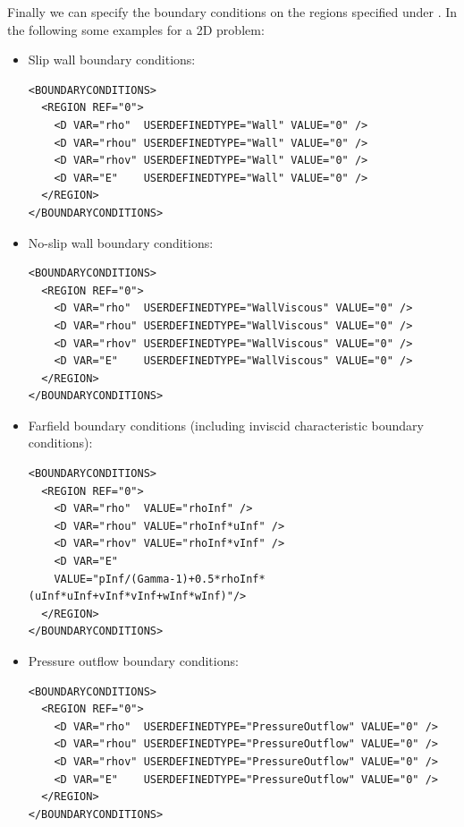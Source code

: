 Finally we can specify the boundary conditions on the regions specified under .
In the following some examples for a 2D problem:
\begin{itemize}
\item Slip wall boundary conditions:
\begin{lstlisting}[style=XmlStyle]                
<BOUNDARYCONDITIONS>
  <REGION REF="0">
    <D VAR="rho"  USERDEFINEDTYPE="Wall" VALUE="0" />
    <D VAR="rhou" USERDEFINEDTYPE="Wall" VALUE="0" />
    <D VAR="rhov" USERDEFINEDTYPE="Wall" VALUE="0" />
    <D VAR="E"    USERDEFINEDTYPE="Wall" VALUE="0" />
  </REGION>
</BOUNDARYCONDITIONS>
\end{lstlisting}

\item No-slip wall boundary conditions:
\begin{lstlisting}[style=XmlStyle]                
<BOUNDARYCONDITIONS>
  <REGION REF="0">
    <D VAR="rho"  USERDEFINEDTYPE="WallViscous" VALUE="0" />
    <D VAR="rhou" USERDEFINEDTYPE="WallViscous" VALUE="0" />
    <D VAR="rhov" USERDEFINEDTYPE="WallViscous" VALUE="0" />
    <D VAR="E"    USERDEFINEDTYPE="WallViscous" VALUE="0" />
  </REGION>
</BOUNDARYCONDITIONS>
\end{lstlisting}

\item Farfield boundary conditions (including inviscid characteristic boundary conditions):
\begin{lstlisting}[style=XmlStyle] 
<BOUNDARYCONDITIONS>  
  <REGION REF="0">
    <D VAR="rho"  VALUE="rhoInf" />
    <D VAR="rhou" VALUE="rhoInf*uInf" />
    <D VAR="rhov" VALUE="rhoInf*vInf" />
    <D VAR="E"    
    VALUE="pInf/(Gamma-1)+0.5*rhoInf*(uInf*uInf+vInf*vInf+wInf*wInf)"/>
  </REGION>
</BOUNDARYCONDITIONS>
\end{lstlisting}

\item Pressure outflow boundary conditions:
\begin{lstlisting}[style=XmlStyle]                
<BOUNDARYCONDITIONS>
  <REGION REF="0">
    <D VAR="rho"  USERDEFINEDTYPE="PressureOutflow" VALUE="0" />
    <D VAR="rhou" USERDEFINEDTYPE="PressureOutflow" VALUE="0" />
    <D VAR="rhov" USERDEFINEDTYPE="PressureOutflow" VALUE="0" />
    <D VAR="E"    USERDEFINEDTYPE="PressureOutflow" VALUE="0" />
  </REGION>
</BOUNDARYCONDITIONS>
\end{lstlisting}
\end{itemize}

